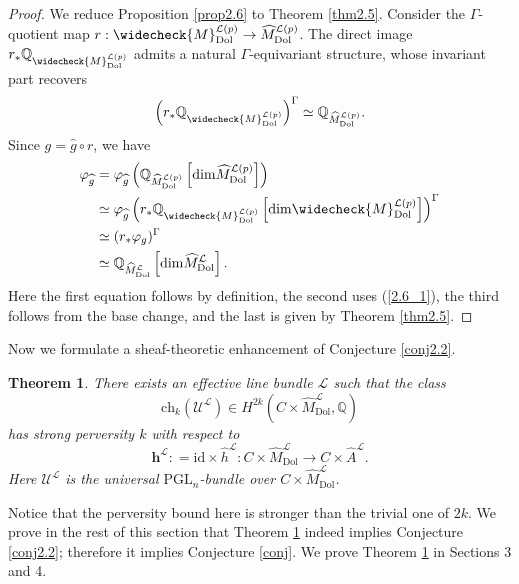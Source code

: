 \documentclass[11pt]{amsart}
\theoremstyle{plain}
\newtheorem{thm}{Theorem}[section]
\theoremstyle{definition}
\theoremstyle{remark}
\newcommand{\BQ}{{\mathbb{Q}}}
\newcommand{\CL}{{\mathcal L}}
\newcommand{\CU}{{\mathcal U}}
\begin{document}
\begin{proof}
We reduce Proposition \ref{prop2.6} to Theorem \ref{thm2.5}. Consider the $\Gamma$-quotient map $r: \widecheck{M}^{\CL(p)}_{\mathrm{Dol}} \to \widehat{M}^{\CL(p)}_{\mathrm{Dol}}$. The direct image $r_* \BQ_{\widecheck{M}^{\CL(p)}_{\mathrm{Dol}}}$ admits a natural $\Gamma$-equivariant structure, whose invariant part recovers 
\begin{equation}\label{2.6_1}
\left(r_* \BQ_{\widecheck{M}^{\CL(p)}_{\mathrm{Dol}}}\right)^{\Gamma} \simeq \BQ_{\widehat{M}^{\CL(p)}_{\mathrm{Dol}}}.
\end{equation}
Since $g = \widehat{g}\circ r$, we have
\begin{align*}
\varphi_{\widehat{g}} & = \varphi_{\widehat{g}}\left(\BQ_{\widehat{M}^{\CL(p)}_{\mathrm{Dol}}}\left[\mathrm{dim} \widehat{M}^{\CL(p)}_{\mathrm{Dol}}\right]\right) \\ & \simeq \varphi_{\widehat{g}}\left(r_* \BQ_{\widecheck{M}^{\CL(p)}_{\mathrm{Dol}}}\left[\mathrm{dim} \widecheck{M}^{\CL(p)}_{\mathrm{Dol}}\right]\right)^{\Gamma}\\
& \simeq (r_* \varphi_g)^\Gamma \\ & \simeq  \BQ_{\widehat{M}^{\CL}_{\mathrm{Dol}}}\left[\mathrm{dim} \widehat{M}^{\CL}_{\mathrm{Dol}}\right].
\end{align*}
Here the first equation follows by definition, the second uses (\ref{2.6_1}), the third follows from the base change, and the last is given by Theorem \ref{thm2.5}.
\end{proof}


Now we formulate a sheaf-theoretic enhancement of Conjecture \ref{conj2.2}.

\begin{thm}\label{conj2.7}
There exists an effective line bundle $\CL$ such that the class
\[
\mathrm{ch}_k(\CU^\CL) \in H^{2k}(C\times \widehat{M}^\CL_{\mathrm{Dol}}, \BQ)
\]
has strong perversity $k$ with respect to 
\[
\mathbf{h}^\CL: = \mathrm{id} \times \widehat{h}^\CL:C\times \widehat{M}^\CL_{\mathrm{Dol}} \to C\times \widehat{A}^\CL. 
\]
Here $\CU^\CL$ is the universal $\mathrm{PGL}_n$-bundle over $C\times \widehat{M}^\CL_{\mathrm{Dol}}$.
\end{thm}

Notice that the perversity bound here is stronger than the trivial one of $2k$.  We prove in the rest of this section that Theorem \ref{conj2.7} indeed implies Conjecture \ref{conj2.2}; therefore it implies Conjecture \ref{conj}. We prove Theorem \ref{conj2.7} in Sections 3 and 4.
\end{document}
